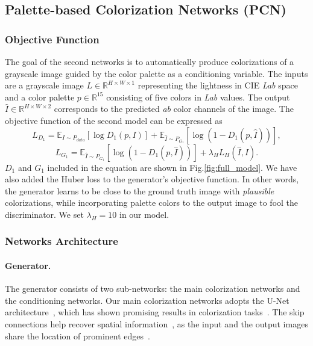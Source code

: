 \documentclass[runningheads]{llncs}
\begin{document}
\subsection{Palette-based Colorization Networks (PCN)}
\label{sec:PCN}
\subsubsection{Objective Function}
The goal of the second networks is to automatically produce
colorizations of a grayscale image guided by the color palette as a conditioning variable. The inputs are a grayscale image $L\in\mathbb{\mathbb{\mathbb{R^{\mathit{H\times W\times1}}}}}$
representing the lightness in CIE \emph{Lab} space and a color palette
$p\in\mathbb{R^{\mathrm{15}}}$ consisting of five colors in \emph{Lab}
values. The output $\hat{I}\in\mathbb{R^{\mathit{H\times W\times2}}}$
corresponds to the predicted \emph{ab} color channels of the image. The
objective function of the second model can be expressed as
\begin{equation}
L_{D_{1}}=\mathbb{E_{\mathit{I\sim P_{data}}}}[\log D_{1}(p,I)]+\mathbb{E_{\mathrm{\mathit{\hat{I}\sim P_{G_{1}}}}}\mathrm{[\log(1-\mathit{D}_{1}(\mathit{p,\hat{I}}))],}}
\end{equation}
\begin{equation}
L_{G_{1}}=\mathbb{E_{\mathit{\hat{I}\sim P_{G_{1}}}}}[\log(1-\mathit{D}_{1}(\mathit{p,\hat{I}}))]+\lambda_{H}L_{H}(\hat{I},I).
\end{equation}
$D_{1}$ and $G_{1}$ included in the equation are shown in Fig.\ref{fig:full_model}. We have also added the Huber loss to the generator's objective function. In other words, the generator learns to be close to the ground truth image with \emph{plausible} colorizations, while incorporating palette colors to the output image to fool the discriminator. We set $\lambda_{H}=10$ in our model.
 
\subsubsection{Networks Architecture}
\label{sec:PCN_architecture}
\paragraph{Generator.}
The generator consists of two sub-networks: the main colorization networks and the conditioning networks. Our main colorization networks adopts the U-Net architecture~\cite{ronneberger2015u}, which has shown promising results in colorization tasks~\cite{isola2017image,zhang2017real}. The skip connections help recover spatial information~\cite{ronneberger2015u}, as the input and the output images share the location of prominent edges~\cite{isola2017image}. 
\end{document}
